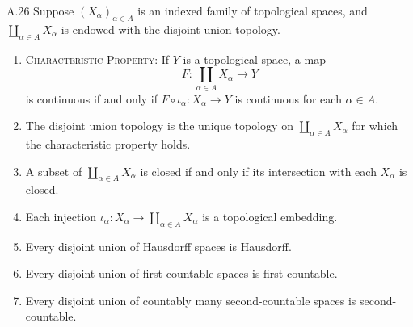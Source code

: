 \begin{exercise}{A.26}
    Suppose \({(X_{\alpha})}_{\alpha \in A}\) is an indexed family of topological spaces, and \(\coprod_{\alpha \in A} X_{\alpha}\) is endowed with the disjoint union topology.

    \begin{enumerate}[itemsep=0pt,label={(\alph*)}]
        \item \textsc{Characteristic Property:} If \(Y\) is a topological space, a map
              \[
                  F : \coprod_{\alpha \in A} X_{\alpha} \to Y
              \]
              is continuous if and only if \(F \circ \iota_{\alpha}: X_{\alpha} \to Y\) is continuous for each \(\alpha \in A\).

        \item The disjoint union topology is the unique topology on \(\coprod_{\alpha \in A} X_{\alpha}\) for which the characteristic property holds.

        \item A subset of \(\coprod_{\alpha \in A} X_{\alpha}\) is closed if and only if its intersection with each \(X_{\alpha}\) is closed.

        \item Each injection \(\iota_{\alpha}: X_{\alpha} \to \coprod_{\alpha \in A} X_{\alpha}\) is a topological embedding.

        \item Every disjoint union of Hausdorff spaces is Hausdorff.

        \item Every disjoint union of first-countable spaces is first-countable.

        \item Every disjoint union of countably many second-countable spaces is second-countable.
    \end{enumerate}
\end{exercise}

